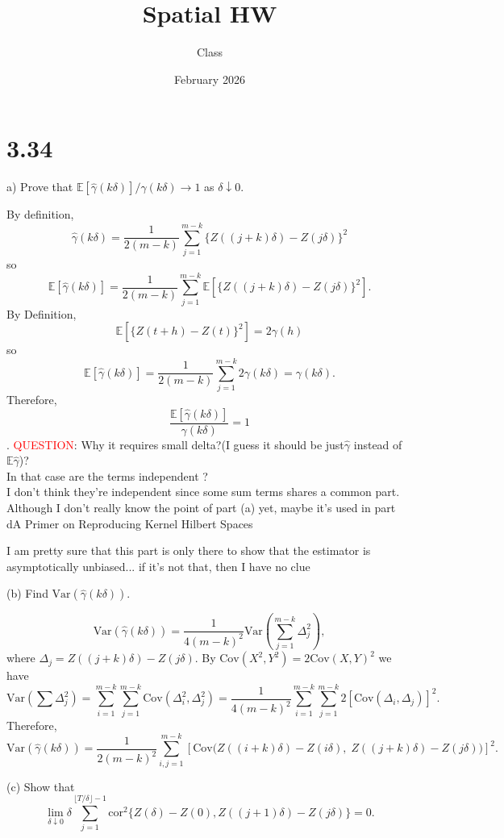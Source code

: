 \documentclass{article}
\title{Spatial HW}
\author{Class}
\date{February 2026}
\begin{document}
\maketitle

\section*{3.34}
a) Prove that $\mathbb{E}[\hat{\gamma}(k\delta)] / \gamma(k\delta) \to 1$ as $\delta \downarrow 0$.

By definition,
$$\hat{\gamma}(k\delta) = \frac{1}{2(m-k)} \sum_{j=1}^{m-k} \{Z((j+k)\delta) - Z(j\delta)\}^2$$ 
so
$$\mathbb{E}[\hat{\gamma}(k\delta)] = \frac{1}{2(m-k)} \sum_{j=1}^{m-k} \mathbb{E}\left[ \{Z((j+k)\delta) - Z(j\delta)\}^2 \right].$$ 
By Definition,
$$\mathbb{E}[\{Z(t+h) - Z(t)\}^2] = 2\gamma(h)$$ 
so
$$\mathbb{E}[\hat{\gamma}(k\delta)] = \frac{1}{2(m-k)} \sum_{j=1}^{m-k} 2\gamma(k\delta)=\gamma(k\delta).$$ 
Therefore, $$\frac{\mathbb{E}[\hat{\gamma}(k\delta)]}{\gamma(k\delta)} = 1$$.
\textcolor{red}{QUESTION}: Why it requires small delta?(I guess it should be just$\hat{\gamma}$ instead of $\mathbb E\hat{\gamma}$)?\\
In that case are the terms independent ?
\color{blue}\\
I don't think they're independent since some sum terms shares a common part. Although I don't really know the point of part (a) yet, maybe it's used in part dA Primer on Reproducing Kernel Hilbert Spaces

I am pretty sure that this part is only there to show that the estimator is asymptotically unbiased... if it's not that, then I have no clue
\color{black}
\medskip

\noindent
(b) Find $\text{Var}(\hat{\gamma}(k\delta))$.

$$\text{Var}(\hat{\gamma}(k\delta)) = \frac{1}{4(m-k)^2} \text{Var}\left( \sum_{j=1}^{m-k} \Delta_j^2 \right),$$ where $\Delta_j = Z((j+k)\delta) - Z(j\delta)$.
By $\text{Cov}(X^2, Y^2) = 2\text{Cov}(X, Y)^2$ we have $$\text{Var}\left( \sum \Delta_j^2 \right) = \sum_{i=1}^{m-k} \sum_{j=1}^{m-k} \text{Cov}(\Delta_i^2, \Delta_j^2) = \frac{1}{4(m-k)^2} \sum_{i=1}^{m-k} \sum_{j=1}^{m-k} 2 [\text{Cov}(\Delta_i, \Delta_j)]^2.$$ 
Therefore, $$\text{Var}(\hat{\gamma}(k\delta)) = \frac{1}{2(m-k)^2} \sum_{i,j=1}^{m-k}  \left[ \text{Cov}\big(Z((i+k)\delta) - Z(i\delta), \; Z((j+k)\delta) - Z(j\delta)\big) \right]^2.$$
\medskip

\noindent
(c) Show that $$\lim_{\delta \downarrow 0} \delta \sum_{j=1}^{\lfloor T/\delta \rfloor - 1} \text{cor}^2 \{Z(\delta) - Z(0), Z((j+1)\delta) - Z(j\delta)\} = 0.$$
\end{document}
